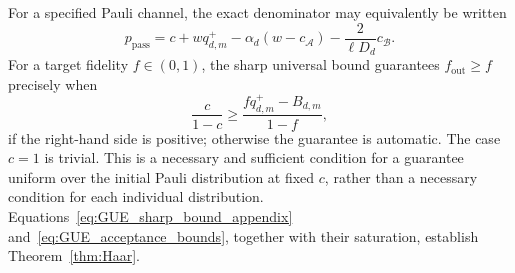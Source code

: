 \documentclass[onecolumn,prx,longbibliography,nofootinbib, superscriptaddress]{revtex4-2}
\theoremstyle{recap}
\begin{document}
For a specified Pauli channel, the exact denominator may equivalently be written
\begin{equation}\label{eq:GUE_explicit_denominator}
    p_{\mathrm{pass}}
      =c+wq^+_{d,m}
       -\alpha_d(w-c_{\mathcal A})
       -\frac{2}{\ell D_d}c_{\mathcal B}.
\end{equation}
For a target fidelity $f\in(0,1)$, the sharp universal bound guarantees $f_{\mathrm{out}}\geq f$ precisely when
\begin{equation}\label{eq:GUE_target_condition}
    \frac{c}{1-c}\geq\frac{f q^+_{d,m}-B_{d,m}}{1-f},
\end{equation}
if the right-hand side is positive; otherwise the guarantee is automatic. The case $c=1$ is trivial. This is a necessary and sufficient condition for a guarantee uniform over the initial Pauli distribution at fixed $c$, rather than a necessary condition for each individual distribution. Equations~\eqref{eq:GUE_sharp_bound_appendix} and~\eqref{eq:GUE_acceptance_bounds}, together with their saturation, establish Theorem~\ref{thm:Haar}.
\end{document}
